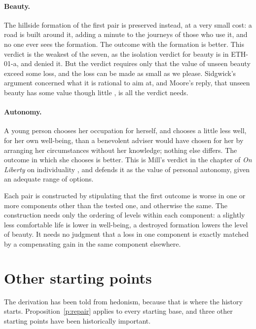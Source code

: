 \documentclass{situationist-preprint}
\begin{document}
\paragraph{Beauty.} The hillside formation of the first pair is preserved instead, at a very small cost: a road is built around it, adding a minute to the journeys of those who use it, and no one ever sees the formation. The outcome with the formation is better. This verdict is the weakest of the seven, as the isolation verdict for beauty is in ETH-01-a, and \citet[III.xiv]{Sidgwick1907} denied it. But the verdict requires only that the value of unseen beauty exceed some loss, and the loss can be made as small as we please. Sidgwick's argument concerned what it is rational to aim at, and Moore's reply, that unseen beauty has some value though little \citep[\S\S50, 113]{Moore1903}, is all the verdict needs.

\paragraph{Autonomy.} A young person chooses her occupation for herself, and chooses a little less well, for her own well-being, than a benevolent adviser would have chosen for her by arranging her circumstances without her knowledge; nothing else differs. The outcome in which she chooses is better. This is Mill's verdict in the chapter of \emph{On Liberty} on individuality \citep[ch.~III]{Mill1859}, and \citet{Raz1986} defends it as the value of personal autonomy, given an adequate range of options.

\begin{remark}\label{r:ordinal}
Each pair is constructed by stipulating that the first outcome is worse in one or more components other than the tested one, and otherwise the same. The construction needs only the ordering of levels within each component: a slightly less comfortable life is lower in well-being, a destroyed formation lowers the level of beauty. It needs no judgment that a loss in one component is exactly matched by a compensating gain in the same component elsewhere.
\end{remark}

\section{Other starting points}\label{s:starts}

The derivation has been told from hedonism, because that is where the history starts. Proposition~\ref{p:repair} applies to every starting base, and three other starting points have been historically important.
\end{document}
